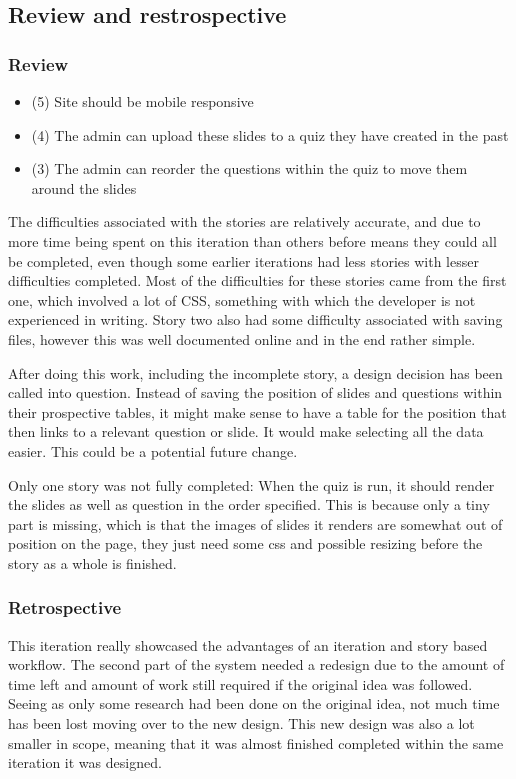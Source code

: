 \subsection{Review and restrospective}
\subsubsection{Review}
\begin{itemize}
	\item (5) Site should be mobile responsive
	\item (4) The admin can upload these slides to a quiz they have created in the past
	\item (3) The admin can reorder the questions within the quiz to move them around the slides
\end{itemize}
The difficulties associated with the stories are relatively accurate, and due to more time being spent on this iteration than others before means they could all be completed, even though some earlier iterations had less stories with lesser difficulties completed. Most of the difficulties for these stories came from the first one, which involved a lot of CSS, something with which the developer is not experienced in writing. Story two also had some difficulty associated with saving files, however this was well documented online and in the end rather simple.

After doing this work, including the incomplete story, a design decision has been called into question. Instead of saving the position of slides and questions within their prospective tables, it might make sense to have a table for the position that then links to a relevant question or slide. It would make selecting all the data easier. This could be a potential future change.

Only one story was not fully completed: When the quiz is run, it should render the slides as well as question in the order specified. This is because only a tiny part is missing, which is that the images of slides it renders are somewhat out of position on the page, they just need some css and possible resizing before the story as a whole is finished.

\subsubsection{Retrospective}
This iteration really showcased the advantages of an iteration and story based workflow. The second part of the system needed a redesign due to the amount of time left and amount of work still required if the original idea was followed. Seeing as only some research had been done on the original idea, not much time has been lost moving over to the new design. This new design was also a lot smaller in scope, meaning that it was almost finished completed within the same iteration it was designed.

